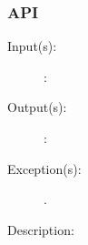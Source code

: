 %
%
%
%
%              

\label{xep}

\subsubsection{API}

\begin{description}
\index{\cfunc[]{}{}}
\item[{\cfunc[]{}{}}: ]
	\begin{description}
	\item[Input(s): ]
		\begin{description}
		\item[: ]
		\end{description}
	\item[Output(s): ]
		\begin{description}
		\item[: ]
		\end{description}
	\item[Exception(s): ]
		\begin{description}
		\item[.]
		\end{description}
	\item[Description: ]
	\end{description}
\end{description}
